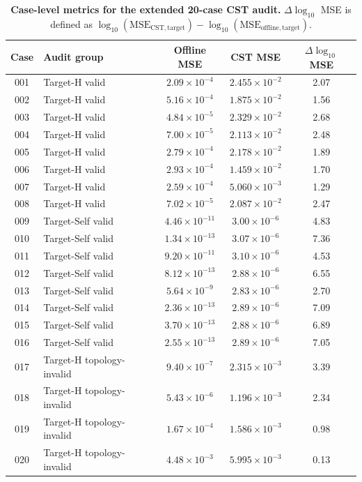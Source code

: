 \documentclass[final,1p,times]{elsarticle}
\begin{document}
\begin{table}[htbp!]
\centering
\caption{\textbf{Case-level metrics for the extended 20-case CST audit.}
$\Delta\log_{10}$ MSE is defined as $\log_{10}(\mathrm{MSE}_{\mathrm{CST,target}})-\log_{10}(\mathrm{MSE}_{\mathrm{offline,target}})$.}
\label{tab:si_phase5_cst_audit_cases}
\scriptsize
\setlength{\tabcolsep}{2.8pt}
\renewcommand{\arraystretch}{1.08}
\begin{tabular}{clccc}
\toprule
Case & Audit group & Offline MSE & CST MSE & $\Delta\log_{10}$ MSE \\
\midrule
001 & Target-H valid & $2.09\times10^{-4}$ & $2.455\times10^{-2}$ & 2.07 \\
002 & Target-H valid & $5.16\times10^{-4}$ & $1.875\times10^{-2}$ & 1.56 \\
003 & Target-H valid & $4.84\times10^{-5}$ & $2.329\times10^{-2}$ & 2.68 \\
004 & Target-H valid & $7.00\times10^{-5}$ & $2.113\times10^{-2}$ & 2.48 \\
005 & Target-H valid & $2.79\times10^{-4}$ & $2.178\times10^{-2}$ & 1.89 \\
006 & Target-H valid & $2.93\times10^{-4}$ & $1.459\times10^{-2}$ & 1.70 \\
007 & Target-H valid & $2.59\times10^{-4}$ & $5.060\times10^{-3}$ & 1.29 \\
008 & Target-H valid & $7.02\times10^{-5}$ & $2.087\times10^{-2}$ & 2.47 \\
009 & Target-Self valid & $4.46\times10^{-11}$ & $3.00\times10^{-6}$ & 4.83 \\
010 & Target-Self valid & $1.34\times10^{-13}$ & $3.07\times10^{-6}$ & 7.36 \\
011 & Target-Self valid & $9.20\times10^{-11}$ & $3.10\times10^{-6}$ & 4.53 \\
012 & Target-Self valid & $8.12\times10^{-13}$ & $2.88\times10^{-6}$ & 6.55 \\
013 & Target-Self valid & $5.64\times10^{-9}$ & $2.83\times10^{-6}$ & 2.70 \\
014 & Target-Self valid & $2.36\times10^{-13}$ & $2.89\times10^{-6}$ & 7.09 \\
015 & Target-Self valid & $3.70\times10^{-13}$ & $2.88\times10^{-6}$ & 6.89 \\
016 & Target-Self valid & $2.55\times10^{-13}$ & $2.89\times10^{-6}$ & 7.05 \\
017 & Target-H topology-invalid & $9.40\times10^{-7}$ & $2.315\times10^{-3}$ & 3.39 \\
018 & Target-H topology-invalid & $5.43\times10^{-6}$ & $1.196\times10^{-3}$ & 2.34 \\
019 & Target-H topology-invalid & $1.67\times10^{-4}$ & $1.586\times10^{-3}$ & 0.98 \\
020 & Target-H topology-invalid & $4.48\times10^{-3}$ & $5.995\times10^{-3}$ & 0.13 \\
\bottomrule
\end{tabular}
\end{table}
\end{document}
